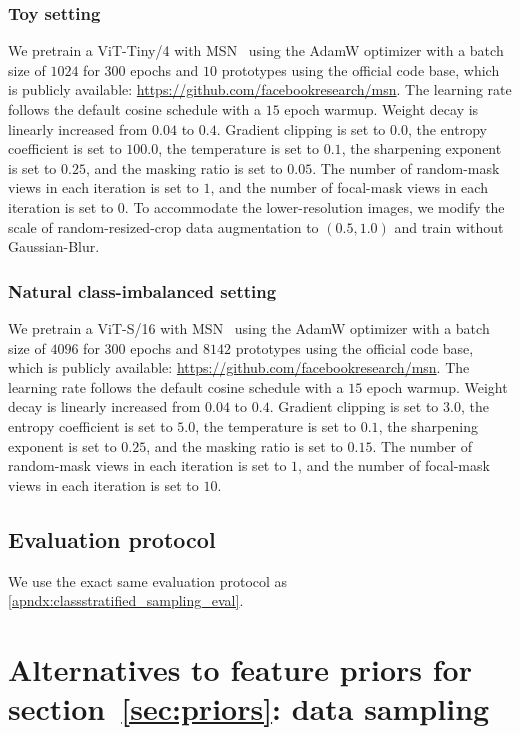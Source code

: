 \documentclass{article} %
\begin{document}
\subsubsection{Toy setting}
We pretrain a ViT-Tiny/4 with MSN~\citep{assran2022masked} using the AdamW optimizer with a batch size of $1024$ for $300$ epochs and $10$ prototypes using the official code base, which is publicly available: \url{https://github.com/facebookresearch/msn}.
The learning rate follows the default cosine schedule with a $15$ epoch warmup.
Weight decay is linearly increased from $0.04$ to $0.4$.
Gradient clipping is set to $0.0$, the entropy coefficient is set to $100.0$, the temperature is set to $0.1$, the sharpening exponent is set to $0.25$, and the masking ratio is set to $0.05$.
The number of random-mask views in each iteration is set to $1$, and the number of focal-mask views in each iteration is set to $0$.
To accommodate the lower-resolution images, we modify the scale of random-resized-crop data augmentation to $(0.5, 1.0)$ and train without Gaussian-Blur.

\subsubsection{Natural class-imbalanced setting}
We pretrain a ViT-S/16 with MSN~\citep{assran2022masked} using the AdamW optimizer with a batch size of $4096$ for $300$ epochs and $8142$ prototypes using the official code base, which is publicly available: \url{https://github.com/facebookresearch/msn}.
The learning rate follows the default cosine schedule with a $15$ epoch warmup.
Weight decay is linearly increased from $0.04$ to $0.4$.
Gradient clipping is set to $3.0$, the entropy coefficient is set to $5.0$, the temperature is set to $0.1$, the sharpening exponent is set to $0.25$, and the masking ratio is set to $0.15$.
The number of random-mask views in each iteration is set to $1$, and the number of focal-mask views in each iteration is set to $10$.

\subsection{Evaluation protocol}

We use the exact same evaluation protocol as \ref{apndx:classstratified_sampling_eval}.

\section{Alternatives to feature priors for section~\ref{sec:priors}: data sampling}
\end{document}
